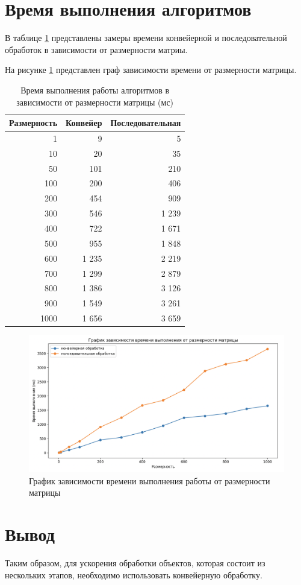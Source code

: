 \section{Время выполнения алгоритмов}

В таблице \ref{tab:table} представлены замеры времени конвейерной
и последовательной обработок в зависимости от размерности матриы. 

На рисунке \ref{fig:graph} представлен граф зависимости времени от размерности матрицы.

\begin{table}[!ht]
    \centering
    \caption{\label{tab:table} Время выполнения работы алгоритмов в зависимости от размерности 
    матрицы (мс)}
    \begin{tabular}{|r|r|r|}
    \hline
        Размерность & Конвейер & Последовательная \\ \hline
        1 & 9 & 5 \\ \hline
        10 & 20 & 35 \\ \hline
        50 & 101 & 210 \\ \hline
        100 & 200 & 406 \\ \hline
        200 & 454 & 909 \\ \hline
        300 & 546 & 1 239 \\ \hline
        400 & 722 & 1 671 \\ \hline
        500 & 955 & 1 848 \\ \hline
        600 & 1 235 & 2 219 \\ \hline
        700 & 1 299 & 2 879 \\ \hline
        800 & 1 386 & 3 126 \\ \hline
        900 & 1 549 & 3 261 \\ \hline
        1000 & 1 656 & 3 659 \\ \hline
    \end{tabular}
\end{table}

\begin{figure}[h]
    \centering
    \includegraphics[width=1\linewidth]{img/graph.png}
    \caption{График зависимости времени выполнения работы от размерности матрицы}
    \label{fig:graph}
\end{figure}

\clearpage
\section{Вывод}
Таким образом, для ускорения обработки объектов, которая состоит из нескольких этапов,
необходимо использовать конвейерную обработку.
